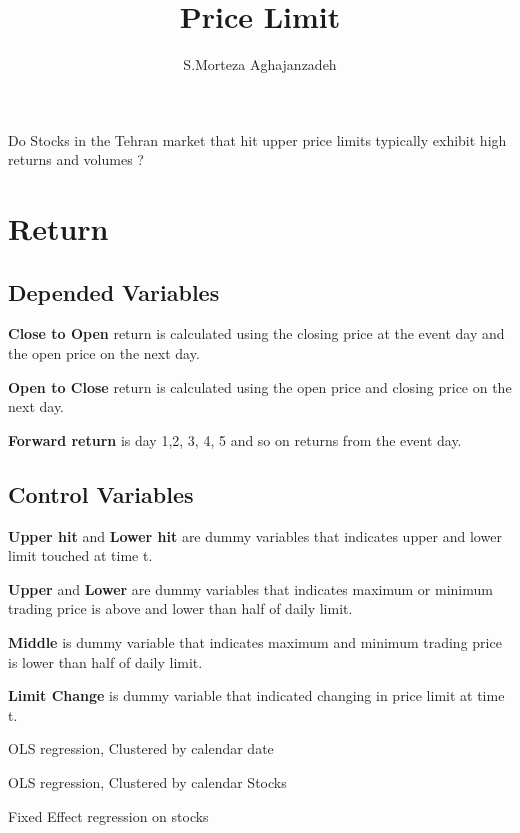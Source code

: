 \documentclass[12pt]{article}
\begin{document}
\title{Price Limit}
\author{S.Morteza Aghajanzadeh}
\maketitle

Do Stocks in the Tehran market that hit upper price limits typically exhibit  high
returns and volumes ?

\section{Return}

\subsection{Depended Variables}
 \textbf{Close to Open} return is calculated using
the closing price at the event day and the open price on the next day.

 \textbf{Open to Close} return is calculated using the open price and closing price on
the next day.

 \textbf{Forward return}  is day 1,2, 3, 4, 5 and so on returns from the event day.

\subsection{Control Variables}
\textbf{Upper hit} and \textbf{Lower hit} are dummy variables that indicates upper and lower limit touched at time t.

\textbf{Upper} and \textbf{Lower} are dummy variables that indicates maximum or minimum trading price is above and lower than half of daily limit.

\textbf{Middle} is dummy variable that indicates maximum and minimum trading price is lower than half of daily limit.

\textbf{Limit Change} is dummy variable that indicated changing in price limit at time t.


\begin{landscape}
\begin{table}[htbp]
\centering

\caption{OLS regression, Clustered by calendar date}
\end{table}


\begin{table}[htbp]
\centering

\caption{OLS regression, Clustered by calendar Stocks}
\end{table}

\begin{table}[htbp]
\centering

\caption{Fixed Effect regression on stocks}
\end{table}
\end{landscape}
\end{document}
